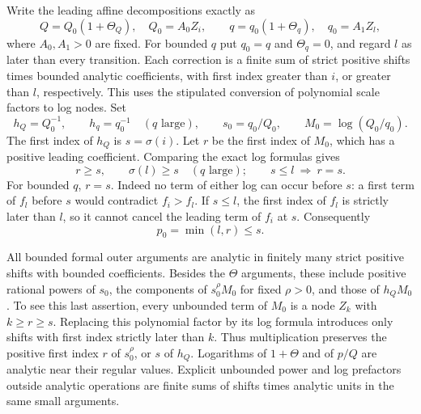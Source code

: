 Write the leading affine decompositions exactly as
\begin{equation}\label{eq:additive-leading-decomposition}
 Q=Q_0(1+\Theta_Q),\quad Q_0=A_0Z_i,\qquad
 q=q_0(1+\Theta_q),\quad q_0=A_1Z_l,
\end{equation}
where $A_0,A_1>0$ are fixed.  For bounded $q$ put $q_0=q$ and
$\Theta_q=0$, and regard $l$ as later than every transition.  Each
correction is a finite sum of strict positive shifts times bounded
analytic coefficients, with first index greater than $i$, or greater
than $l$, respectively.  This uses the stipulated conversion of
polynomial scale factors to log nodes.  Set
\begin{equation}\label{eq:additive-dispersal-variables}
 h_Q=Q_0^{-1},\qquad h_q=q_0^{-1}\quad(q\text{ large}),\qquad
 s_0=q_0/Q_0,\qquad M_0=\log(Q_0/q_0).
\end{equation}
The first index of $h_Q$ is $s=\sigma(i)$.  Let $r$ be the first index
of $M_0$, which has a positive leading coefficient.  Comparing the
exact log formulas gives
\begin{equation}\label{eq:additive-index-order}
 r\ge s,\qquad \sigma(l)\ge s\quad(q\text{ large});\qquad
 s\le l\ \Longrightarrow\ r=s.
\end{equation}
For bounded $q$, $r=s$.  Indeed no term of either log can occur before
$s$: a first term of $f_l$ before $s$ would contradict $f_i>f_l$.
If $s\le l$, the first index of $f_l$ is strictly later than $l$,
so it cannot cancel the leading term of $f_i$ at $s$.
Consequently
\begin{equation}\label{eq:additive-retirement-index}
 p_0=\min(l,r)\le s.
\end{equation}

All bounded formal outer arguments are analytic in finitely many
strict positive shifts with bounded coefficients.  Besides the $\Theta$
arguments, these include positive rational powers of $s_0$, the
components of $s_0^\rho M_0$ for fixed $\rho>0$, and those of
$h_QM_0$.  To see this last assertion, every unbounded term of $M_0$
is a node $Z_k$ with $k\ge r\ge s$.  Replacing this polynomial factor
by its log formula introduces only shifts with first index strictly
later than $k$.  Thus multiplication preserves the positive first
index $r$ of $s_0^\rho$, or $s$ of $h_Q$.  Logarithms of
$1+\Theta$ and of $p/Q$ are analytic near their regular values.
Explicit unbounded power and log prefactors outside analytic operations
are finite sums of shifts times analytic units in the same small
arguments.

